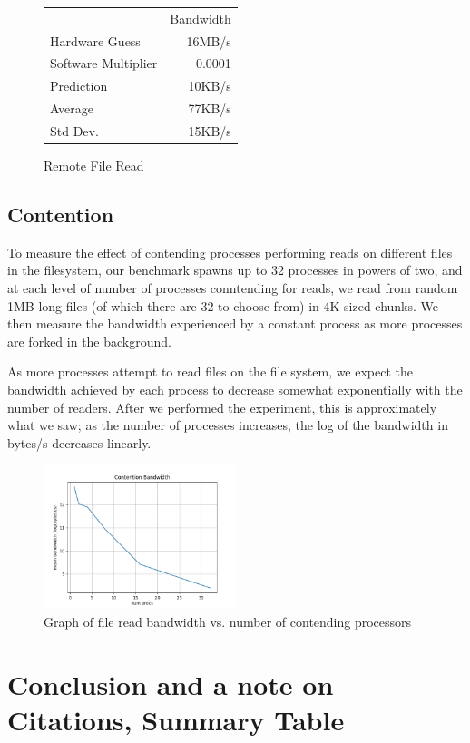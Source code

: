 \documentclass[letterpaper,twocolumn,10pt]{article}
\begin{document}
\begin{figure}
	\centering
    \begin{tabular}{lr}
      & Bandwidth\\
Hardware Guess  & 16MB/s\\
Software Multiplier & 0.0001\\
Prediction & 10KB/s\\
Average  & 77KB/s\\
Std Dev. & 15KB/s
\end{tabular}
\caption{Remote File Read}
\label{tab:generaloverheads}
\end{figure}

\subsection{Contention}
To measure the effect of contending processes performing reads on different
files in the filesystem, our benchmark spawns up to 32 processes in powers of
two, and at each level of number of processes conntending for reads, we read
from random 1MB long files (of which there are 32 to choose from) in 4K sized 
chunks. We then measure the bandwidth experienced by a constant process as more
processes are forked in the background.

As more processes attempt to read files on the file system, we expect the bandwidth
achieved by each process to decrease somewhat exponentially with the number of readers. After 
we performed the experiment, this is approximately what we saw; as the number of processes 
increases, the log of the bandwidth in bytes/s decreases linearly.

\begin{figure}
	\centering
    \includegraphics[width=0.5\textwidth]{graphs/contention}
  \caption{Graph of file read bandwidth vs. number of contending processors}
	\label{fig:filecache}
\end{figure}
\section{Conclusion and a note on Citations, Summary Table}
\end{document}

